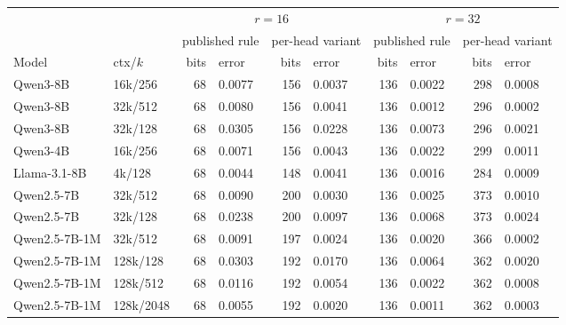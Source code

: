 \begin{tabular}{llrlrlrlrl}
\toprule
 & & \multicolumn{4}{c}{$r{=}16$} & \multicolumn{4}{c}{$r{=}32$} \\
 & & \multicolumn{2}{c}{published rule} & \multicolumn{2}{c}{per-head variant} & \multicolumn{2}{c}{published rule} & \multicolumn{2}{c}{per-head variant} \\
Model & ctx/$k$ & bits & error & bits & error & bits & error & bits & error \\
\midrule
Qwen3-8B & 16k/256 & 68 & 0.0077 & 156 & 0.0037 & 136 & 0.0022 & 298 & 0.0008 \\
Qwen3-8B & 32k/512 & 68 & 0.0080 & 156 & 0.0041 & 136 & 0.0012 & 296 & 0.0002 \\
Qwen3-8B & 32k/128 & 68 & 0.0305 & 156 & 0.0228 & 136 & 0.0073 & 296 & 0.0021 \\
Qwen3-4B & 16k/256 & 68 & 0.0071 & 156 & 0.0043 & 136 & 0.0022 & 299 & 0.0011 \\
Llama-3.1-8B & 4k/128 & 68 & 0.0044 & 148 & 0.0041 & 136 & 0.0016 & 284 & 0.0009 \\
Qwen2.5-7B & 32k/512 & 68 & 0.0090 & 200 & 0.0030 & 136 & 0.0025 & 373 & 0.0010 \\
Qwen2.5-7B & 32k/128 & 68 & 0.0238 & 200 & 0.0097 & 136 & 0.0068 & 373 & 0.0024 \\
Qwen2.5-7B-1M & 32k/512 & 68 & 0.0091 & 197 & 0.0024 & 136 & 0.0020 & 366 & 0.0002 \\
Qwen2.5-7B-1M & 128k/128 & 68 & 0.0303 & 192 & 0.0170 & 136 & 0.0064 & 362 & 0.0020 \\
Qwen2.5-7B-1M & 128k/512 & 68 & 0.0116 & 192 & 0.0054 & 136 & 0.0022 & 362 & 0.0008 \\
Qwen2.5-7B-1M & 128k/2048 & 68 & 0.0055 & 192 & 0.0020 & 136 & 0.0011 & 362 & 0.0003 \\
\bottomrule
\end{tabular}